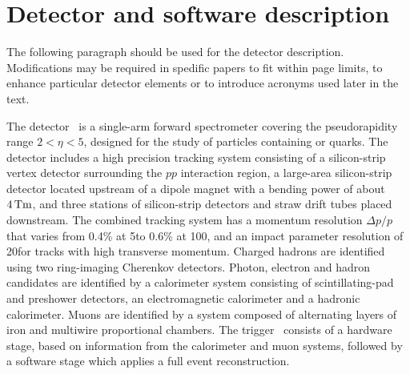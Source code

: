\section{Detector and software description}
\label{sec:Detector}
The following paragraph should be used for the detector
description. Modifications may be required in spedific papers to fit
within page limits, to enhance particular detector elements or to
introduce acronyms used later in the text.

The \lhcb detector~\cite{Alves:2008zz} is a single-arm forward
spectrometer covering the \mbox{pseudorapidity} range $2<\eta <5$,
designed for the study of particles containing \bquark or \cquark
quarks. The detector includes a high precision tracking system
consisting of a silicon-strip vertex detector surrounding the $pp$
interaction region, a large-area silicon-strip detector located
upstream of a dipole magnet with a bending power of about
$4{\rm\,Tm}$, and three stations of silicon-strip detectors and straw
drift tubes placed downstream. The combined tracking system has a
momentum resolution $\Delta p/p$ that varies from 0.4\% at 5\gevc to
0.6\% at 100\gevc, and an impact parameter resolution of 20\mum for
tracks with high transverse momentum. Charged hadrons are identified
using two ring-imaging Cherenkov detectors. Photon, electron and
hadron candidates are identified by a calorimeter system consisting of
scintillating-pad and preshower detectors, an electromagnetic
calorimeter and a hadronic calorimeter. Muons are identified by a
system composed of alternating layers of iron and multiwire
proportional chambers. The trigger~\cite{Aaij:2012me} consists of a
hardware stage, based on information from the calorimeter and muon
systems, followed by a software stage which applies a full event
reconstruction.

